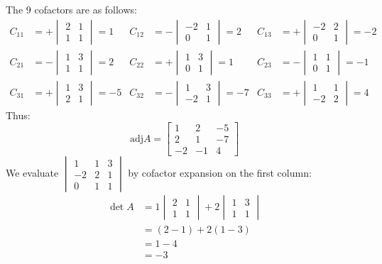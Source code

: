 \documentclass[11pt]{scrartcl}
\theoremstyle{dotlessP}
\theoremstyle{dotlessN}
\begin{document}
The 9 cofactors are as follows:
\begin{align*}
	C_{11} &= + 
	\begin{vmatrix}
		2 & 1 \\
		1 & 1
	\end{vmatrix} = 1 & 
	C_{12} &= -
	\begin{vmatrix}
		-2 & 1 \\
		0 & 1
	\end{vmatrix} = 2 &
	C_{13} &= +
	\begin{vmatrix}
		-2 & 2 \\
		0 & 1
	\end{vmatrix} = -2 \\
	C_{21} &= -
	\begin{vmatrix}
		1 & 3 \\
		1 & 1
	\end{vmatrix} = 2 &
	C_{22} &= +
	\begin{vmatrix}
		1 & 3 \\
		0 & 1
	\end{vmatrix} = 1
		   &
	C_{23} &= -
	\begin{vmatrix}
		1 & 1\\
		0 & 1
	\end{vmatrix} = -1 \\
	C_{31} &= +
	\begin{vmatrix}
		1 & 3 \\
		2 & 1
	\end{vmatrix} = -5 & 
	C_{32} &= -
	\begin{vmatrix}
		1 & 3 \\
		-2 & 1
	\end{vmatrix} = -7 &
	C_{33} &= +
	\begin{vmatrix}
		1 & 1 \\
		-2 & 2
	\end{vmatrix} = 4
\end{align*}
Thus:
\[
	\text{adj} A = 
	\begin{bmatrix}
		1 & 2 & -5 \\
		2 & 1 & -7 \\
		-2 & -1 & 4
	\end{bmatrix}
\] 
We evaluate $
\begin{vmatrix}
	1 & 1 & 3 \\
	-2 & 2 & 1 \\
	0 & 1 & 1
\end{vmatrix}
$ by cofactor expansion on the first column:
\begin{align*}
	\det A &= 1
	\begin{vmatrix}
		2 & 1 \\
		1 & 1
	\end{vmatrix} + 2
	\begin{vmatrix}
		1 & 3 \\
		1 & 1
	\end{vmatrix} \\
		   &= (2-1) + 2(1 - 3) \\
		   &= 1 - 4 \\
		   &= -3
\end{align*}
\end{document}
